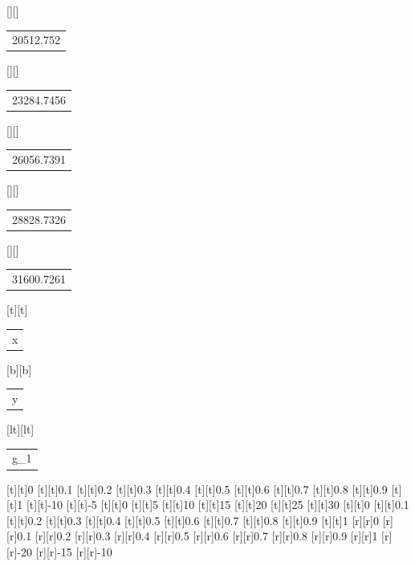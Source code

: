 \begin{psfrags}
[][]{\color[rgb]{0,0,0}\setlength{\tabcolsep}{0pt}\begin{tabular}{c}20512.752\end{tabular}}%
[][]{\color[rgb]{0,0,0}\setlength{\tabcolsep}{0pt}\begin{tabular}{c}23284.7456\end{tabular}}%
[][]{\color[rgb]{0,0,0}\setlength{\tabcolsep}{0pt}\begin{tabular}{c}26056.7391\end{tabular}}%
[][]{\color[rgb]{0,0,0}\setlength{\tabcolsep}{0pt}\begin{tabular}{c}28828.7326\end{tabular}}%
[][]{\color[rgb]{0,0,0}\setlength{\tabcolsep}{0pt}\begin{tabular}{c}31600.7261\end{tabular}}%
[t][t]{\color[rgb]{0,0,0}\setlength{\tabcolsep}{0pt}\begin{tabular}{c}x\end{tabular}}%
[b][b]{\color[rgb]{0,0,0}\setlength{\tabcolsep}{0pt}\begin{tabular}{c}y\end{tabular}}%
[lt][lt]{\color[rgb]{0,0,0}\setlength{\tabcolsep}{0pt}\begin{tabular}{l}g_1\end{tabular}}%
%
[t][t]{0}%
[t][t]{0.1}%
[t][t]{0.2}%
[t][t]{0.3}%
[t][t]{0.4}%
[t][t]{0.5}%
[t][t]{0.6}%
[t][t]{0.7}%
[t][t]{0.8}%
[t][t]{0.9}%
[t][t]{1}%
[t][t]{-10}%
[t][t]{-5}%
[t][t]{0}%
[t][t]{5}%
[t][t]{10}%
[t][t]{15}%
[t][t]{20}%
[t][t]{25}%
[t][t]{30}%
[t][t]{0}%
[t][t]{0.1}%
[t][t]{0.2}%
[t][t]{0.3}%
[t][t]{0.4}%
[t][t]{0.5}%
[t][t]{0.6}%
[t][t]{0.7}%
[t][t]{0.8}%
[t][t]{0.9}%
[t][t]{1}%
%
[r][r]{0}%
[r][r]{0.1}%
[r][r]{0.2}%
[r][r]{0.3}%
[r][r]{0.4}%
[r][r]{0.5}%
[r][r]{0.6}%
[r][r]{0.7}%
[r][r]{0.8}%
[r][r]{0.9}%
[r][r]{1}%
[r][r]{-20}%
[r][r]{-15}%
[r][r]{-10}%

\end{psfrags}
